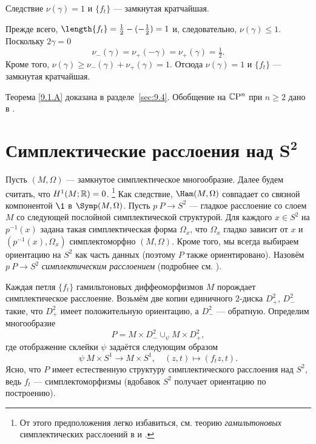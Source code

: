 \begin{thm}[(\cite{LM2})]{Следствие} $\nu(\gamma) = 1$ и $\{f_t\}$ —
  замкнутая кратчайшая.
\end{thm}

Прежде всего, $\length\{f_t\} =\frac12 - (-\frac12 ) = 1$ и,
следовательно, $\nu(\gamma) \le 1$. 
Поскольку $2\gamma = 0$
\[\nu_- (\gamma) = \nu_+ (-\gamma) = \nu_+ (\gamma) =\tfrac12.\]
Кроме того, $\nu(\gamma) \ge \nu_- (\gamma) + \nu_+ (\gamma) = 1$.
Отсюда $\nu(\gamma) = 1$ и $\{f_t\}$ — замкнутая кратчайшая.
\qeds

Теорема \ref{9.1.A} доказана в разделе~\ref{sec:9.4}.
Обобщение на $\mathbb{C}\mathrm{P}^n$ при $n \ge 2$ дано в \cite{P3}.

\section[\texorpdfstring{Симплектические расслоения над
    $S^2$}{Симплектические расслоения над S²}]{Симплектические
  расслоения над $\bm{S^2}$} 
\label{sec:9.2}

Пусть $(M, \Omega)$ — замкнутое симплектическое многообразие.
Далее будем считать, что $H^1 (M;\mathbb{R}) = 0$.%
\footnote{От этого предположения легко избавиться, см. теорию \emph{гамильтоновых} симплектических расслоений в \cite{MS} и \cite{P4}.} 
Как следствие, $\Ham(M, \Omega)$ совпадает со связной компонентой $\1$
в $\Symp(M, \Omega)$. 
Пусть $p \: P \to S^2$ — гладкое расслоение со слоем $M$ со
следующей послойной симплектической структурой.
Для каждого $x \in S^2$ на $p^{-1} (x)$ задана такая симплектическая форма
$\Omega_x$, что $\Omega_x$ гладко зависит от $x$ и $(p^{-1} (x),
\Omega_x)$  симплектоморфно $(M, \Omega)$.
Кроме того, мы всегда выбираем ориентацию на $S^2$ как часть данных
(поэтому $P$ также ориентировано).
Назовём $p\: P\to S^2$ \emph{симплектическим расслоением} (подробнее
см. \cite{MS}). 

Каждая петля $\{f_t\}$ гамильтоновых диффеоморфизмов $M$ порождает
симплектическое расслоение.
Возьмём две копии единичного $2$-диска $D_+^2$, $D_-^2$ такие, что
$D_+^2$ имеет положительную ориентацию, а $D_-^2$ — обратную.
Определим многообразие
\[P =  M  \times D_-^2 \cup_\psi M \times D_+^2,\]
где отображение склейки $\psi$ задаётся следующим образом
\[\psi \: M \times S^1 \to M \times S^1,\quad (z, t) \mapsto (f_t z, t).\]
Ясно, что $P$ имеет естественную структуру симплектического расслоения
над $S^2$, ведь $f_t$ — симплектоморфизмы (вдобавок $S^2$
получает ориентацию по построению).

